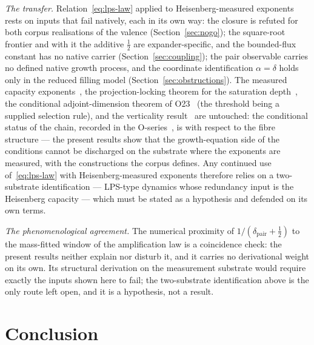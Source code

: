\documentclass[11pt,a4paper]{article}
\theoremstyle{definition}
\begin{document}
\emph{The transfer.}
Relation~\eqref{eq:lps-law} applied to Heisenberg-measured exponents rests on inputs that fail natively,
each in its own way: the closure is refuted for both corpus realisations of the valence
(Section~\ref{sec:nogo}); the square-root frontier and with it the additive $\tfrac12$ are
expander-specific, and the bounded-flux constant has no native carrier (Section~\ref{sec:coupling}); the
pair observable carries no defined native growth process, and the coordinate identification
$\alpha = \delta$ holds only in the reduced filling model (Section~\ref{sec:obstructions}).
The measured capacity exponents~\cite{Beau2026a16,Beau2026a20,Beau2026a29}, the projection-locking
theorem for the saturation depth~\cite{Beau2026a26}, the conditional adjoint-dimension theorem of O23~\cite{Beau2026a27}
(the threshold being a supplied selection rule), and the verticality
result~\cite{Beau2026a28} are untouched: the conditional status of the chain, recorded in the
O-series~\cite{Beau2026a25,Beau2026a28}, is with respect to the fibre structure --- the present results
show that the growth-equation side of the conditions cannot be discharged on the substrate where the
exponents are measured, with the constructions the corpus defines.
Any continued use of~\eqref{eq:lps-law} with Heisenberg-measured exponents therefore relies on a
two-substrate identification --- LPS-type dynamics whose redundancy input is the Heisenberg capacity ---
which must be stated as a hypothesis and defended on its own terms.

\emph{The phenomenological agreement.}
The numerical proximity of $1/(\delta_{\mathrm{pair}} + \tfrac12)$ to the mass-fitted window of the
amplification law is a coincidence check: the present results neither explain nor disturb it, and it
carries no derivational weight on its own.
Its structural derivation on the measurement substrate would require exactly the inputs shown here to
fail; the two-substrate identification above is the only route left open, and it is a hypothesis, not a
result.

\section{Conclusion}
\label{sec:conclusion}
\end{document}
